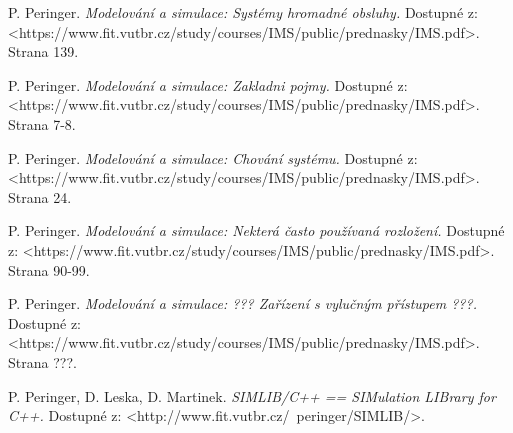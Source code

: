 \documentclass[12pt,a4paper]{article}
\begin{document}
\begin{thebibliography}{99}

 P. Peringer.
\textit{Modelování a simulace: Systémy hromadné obsluhy.}
Dostupné z: \textless https://www.fit.vutbr.cz/study/courses/IMS/public/prednasky/IMS.pdf\textgreater.
Strana 139.

 P. Peringer.
\textit{Modelování a simulace: Zakladni pojmy.}
Dostupné z: \textless https://www.fit.vutbr.cz/study/courses/IMS/public/prednasky/IMS.pdf\textgreater.
Strana 7-8.

 P. Peringer.
\textit{Modelování a simulace: Chování systému.}
Dostupné z: \textless https://www.fit.vutbr.cz/study/courses/IMS/public/prednasky/IMS.pdf\textgreater.
Strana 24.

 P. Peringer.
\textit{Modelování a simulace: Nekterá často používaná rozložení.}
Dostupné z: \textless https://www.fit.vutbr.cz/study/courses/IMS/public/prednasky/IMS.pdf\textgreater.
Strana 90-99.

 P. Peringer.
\textit{Modelování a simulace: ??? Zařízení s vylučným přístupem ???.}
Dostupné z: \textless https://www.fit.vutbr.cz/study/courses/IMS/public/prednasky/IMS.pdf\textgreater.
Strana ???.

 P. Peringer, D. Leska, D. Martinek.
\textit{SIMLIB/C++  ==  SIMulation LIBrary for C++.}
Dostupné z: \textless http://www.fit.vutbr.cz/~peringer/SIMLIB/\textgreater.


\end{thebibliography}
\end{document}
